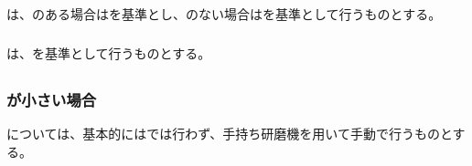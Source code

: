 \subsection{\EndFaceRChamferMillingReferencePoint}

\subsubsection{\EndFaceOutRChamferMillingReferencePoint}
\EndFaceOutRChamferMillingReferencePoint は、\Outcut のある場合は\OutcutCenter を基準とし、\Outcut のない場合は\EndFaceIDCenter を基準として行うものとする。

\subsubsection{\EndFaceInRChamferMilling}
\EndFaceInRChamferMillingReferencePoint は、\EndFaceIDCenter を基準として行うものとする。


\subsection{\EndFaceOutRChamferMilling}

\subsubsection{\EndFaceOutRChamferRadius が小さい場合}
\EndFaceOutRChamfer については、基本的には\MMC では行わず、手持ち研磨機を用いて手動で行うものとする。

